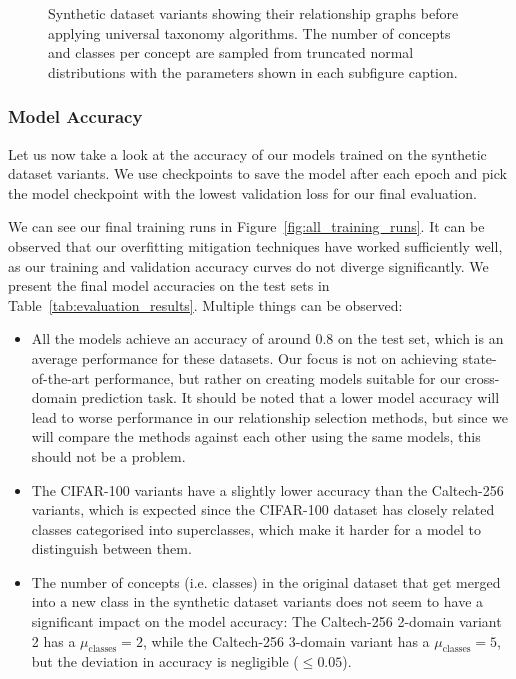 \begin{figure}[ht]
      \caption{Synthetic dataset variants showing their relationship graphs before applying universal taxonomy algorithms.
            The number of concepts and classes per concept are sampled from truncated normal distributions with the parameters shown in each subfigure caption.}
      \label{fig:synthetic_variants}
\end{figure}

\subsubsection{Model Accuracy}

Let us now take a look at the accuracy of our models trained on the synthetic dataset variants.
We use checkpoints to save the model after each epoch and pick the model checkpoint with the lowest validation loss
for our final evaluation.

We can see our final training runs in Figure~\ref{fig:all_training_runs}.
It can be observed that our overfitting mitigation techniques have worked sufficiently well,
as our training and validation accuracy curves do not diverge significantly.
We present the final model accuracies on the test sets in Table~\ref{tab:evaluation_results}.
Multiple things can be observed:
\begin{itemize}
      \item All the models achieve an accuracy of around 0.8 on the test set,
            which is an average performance for these datasets.
            Our focus is not on achieving state-of-the-art performance,
            but rather on creating models suitable for our cross-domain prediction task.
            It should be noted that a lower model accuracy will lead to worse performance
            in our relationship selection methods, but since we will compare the methods against each other
            using the same models, this should not be a problem.
      \item The CIFAR-100 variants have a slightly lower accuracy than the Caltech-256 variants,
            which is expected since the CIFAR-100 dataset has closely related classes
            categorised into superclasses, which make it harder for a model to distinguish between them.
      \item The number of concepts (i.e. classes) in the original dataset that get merged
            into a new class in the synthetic dataset variants does not seem to have a significant impact
            on the model accuracy: The Caltech-256 2-domain variant 2 has a $\mu_{\text{classes}}=2$,
            while the Caltech-256 3-domain variant has a $\mu_{\text{classes}}=5$,
            but the deviation in accuracy is negligible ($\leq 0.05$).
\end{itemize}

